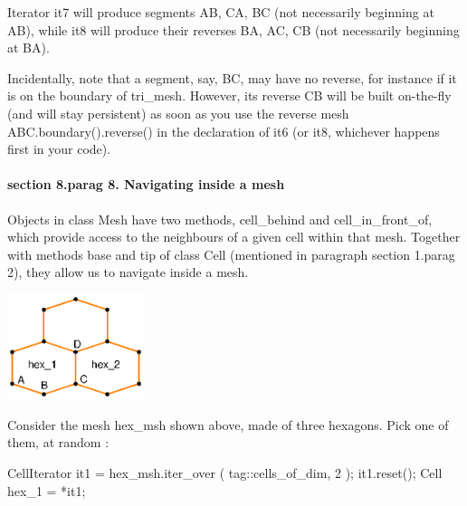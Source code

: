 {Iterator {\codett it7} will produce segments {\codett AB}, {\codett CA}, {\codett BC}
(not necessarily beginning at {\codett AB}), while {\codett it8} will produce their reverses
{\codett BA}, {\codett AC}, {\codett CB} (not necessarily beginning at {\codett BA}).

Incidentally, note that a segment, say, {\codett BC}, may have no reverse,
for instance if it is on the boundary of {\codett tri\_mesh}.
However, its reverse {\codett CB} will be built on-the-fly (and will stay persistent)
as soon as you use the reverse mesh {\codett ABC.boundary().reverse()} in the declaration of
{\codett it6} (or {\codett it8}, whichever happens first in your code).


\paragraph{\numb section 8.\numb parag 8. Navigating inside a mesh}

Objects in class {\codett Mesh} have two methods, {\codett cell\_behind} and
{\codett cell\_in\_front\_of},
which provide access to the neighbours of a given cell within that mesh.
Together with methods {\codett base} and {\codett tip} of class {\codett Cell}
(mentioned in paragraph \numb section 1.\numb parag 2), they allow us to navigate inside
a mesh.

{ 
\centerline{\includegraphics[width=4cm]{malha-hex.eps}} }
\medskip

Consider the mesh {\codett hex\_msh} shown above, made of three hexagons.
Pick one of them, at random :

\verbatim
   CellIterator it1 = hex_msh.iter_over ( tag::cells_of_dim, 2 );
   it1.reset();
   Cell hex_1 = *it1;
\endverbatim

}
